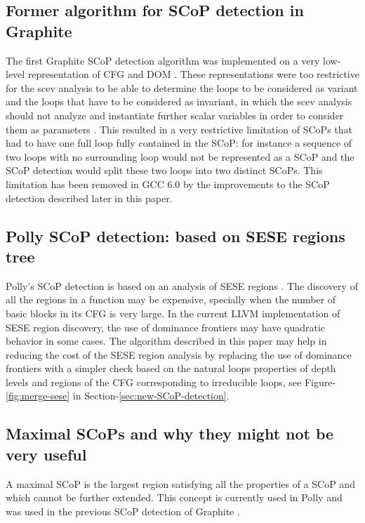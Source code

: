 \documentclass{sig-alternate}
\begin{document}
\subsection{Former algorithm for SCoP detection in Graphite}
\label{subsec:graphite-SCoP}
The first Graphite SCoP detection algorithm was implemented on a very low-level
representation of CFG and DOM \cite{graphite}.  These representations were too
restrictive for the scev analysis to be able to determine the loops to be
considered as variant and the loops that have to be considered as invariant, in
which the scev analysis should not analyze and instantiate further scalar
variables in order to consider them as parameters \cite{scev}.  This resulted in
a very restrictive limitation of SCoPs that had to have one full loop fully
contained in the SCoP: for instance a sequence of two loops with no surrounding
loop would not be represented as a SCoP and the SCoP detection would split these
two loops into two distinct SCoPs.  This limitation has been removed in GCC 6.0
by the improvements to the SCoP detection described later in this paper.

\subsection{Polly SCoP detection: based on SESE regions tree}
\label{subsec:polly-SCoP}
Polly's SCoP detection is based on an analysis of SESE regions \cite{polly}.
The discovery
of all the regions in a function may be expensive, specially when the number of
basic blocks in its CFG is very large.  In the current LLVM implementation of
SESE region discovery, the use of dominance frontiers may have quadratic
behavior in some cases.  The algorithm described in this paper may help in
reducing the cost of the SESE region analysis by replacing the use of dominance
frontiers with a simpler check based on the natural loops properties of depth
levels and regions of the CFG corresponding to irreducible loops, see
Figure-\ref{fig:merge-sese} in Section-\ref{sec:new-SCoP-detection}.

\subsection{Maximal SCoPs and why they might not be very useful}
\label{subsec:maximality}
A maximal SCoP is the largest region satisfying all the properties of a SCoP and
which cannot be further extended.  This concept is currently used in Polly
\cite{polly} and was used in the previous SCoP detection of Graphite
\cite{graphite}.
\end{document}
